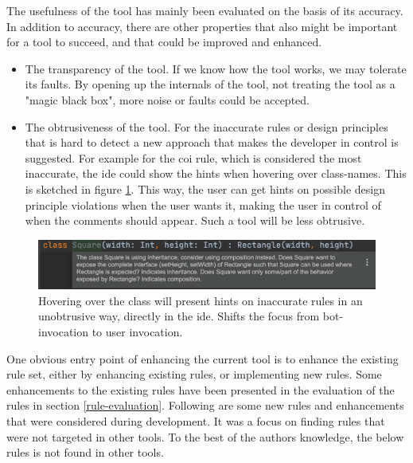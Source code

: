 \documentclass[pdftex,10pt,b5paper,twoside]{report}
\begin{document}
The usefulness of the tool has mainly been evaluated on the basis of its accuracy. In addition to accuracy, there are other properties that also might be important for a tool to succeed, and that could be improved and enhanced. 

\begin{itemize}
    \item The transparency of the tool. If we know how the tool works, we may tolerate its faults. By opening up the internals of the tool, not treating the tool as a "magic black box", more noise or faults could be accepted.
    
    \item The obtrusiveness of the tool. For the inaccurate rules or design principles that is hard to detect a new approach that makes the developer in control is suggested. For example for the \gls{coi} rule, which is considered the most inaccurate, the \gls{ide} could show the hints when hovering over class-names. This is sketched in figure \ref{fig:a-new-beginning}. This way, the user can get hints on possible design principle violations when the user wants it, making the user in control of when the comments should appear. Such a tool will be less obtrusive. 

\end{itemize}


\begin{figure}[h!]
    \centering
    \includegraphics[width=\linewidth]{report/a-new-beginning (2).png}
    \caption{Hovering over the class will present hints on inaccurate rules in an unobtrusive way, directly in the \gls{ide}. Shifts the focus from bot-invocation to user invocation.}
    \label{fig:a-new-beginning}
\end{figure}


One obvious entry point of enhancing the current tool is to enhance the existing rule set, either by enhancing existing rules, or implementing new rules. Some enhancements to the existing rules have been presented in the evaluation of the rules in section \ref{rule-evaluation}. Following are some new rules and enhancements that were considered during development. It was a focus on finding rules that were not targeted in other tools. To the best of the authors knowledge, the below rules is not found in other tools. 
\end{document}
